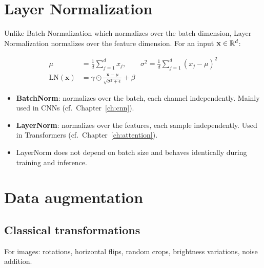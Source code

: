 \section{Layer Normalization}
\label{sec:layernorm}

Unlike Batch Normalization which normalizes over the batch dimension,
Layer Normalization \cite{ba2016layer} normalizes over the feature
dimension. For an input $\mathbf{x} \in \mathbb{R}^d$:

\begin{keyformulas}[title=\textbf{Layer Normalization}]
\begin{align}
\mu &= \frac{1}{d} \sum_{j=1}^d x_j, \qquad
\sigma^2 = \frac{1}{d} \sum_{j=1}^d (x_j - \mu)^2 \\
\text{LN}(\mathbf{x}) &= \gamma \odot \frac{\mathbf{x} - \mu}{\sqrt{\sigma^2 + \epsilon}} + \beta
\end{align}
\end{keyformulas}

\begin{remark}
\begin{itemize}
  \item \textbf{BatchNorm}: normalizes over the batch, each channel independently.
    Mainly used in CNNs (cf.\ Chapter~\ref{ch:cnn}).
  \item \textbf{LayerNorm}: normalizes over the features, each sample
    independently. Used in Transformers
    (cf.\ Chapter~\ref{ch:attention}).
  \item LayerNorm does not depend on batch size and behaves identically
    during training and inference.
\end{itemize}
\end{remark}

\section{Data augmentation}
\label{sec:data-augmentation}

\subsection{Classical transformations}

For images: rotations, horizontal flips, random crops, brightness
variations, noise addition.

